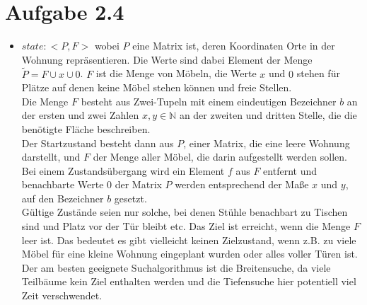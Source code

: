 \documentclass[12pt, paper=a4]{article}
\begin{document}
\section*{Aufgabe 2.4}
\begin{itemize}
\item $state: <P,F>$ wobei $P$ eine Matrix ist, deren Koordinaten Orte in der Wohnung repräsentieren.
    Die Werte sind dabei Element der Menge $\tilde{P} = F \cup x \cup 0$.
      $F$ ist die Menge von Möbeln, die Werte $x$ und $0$ stehen für Plätze auf denen keine
      Möbel stehen können und freie Stellen.\\
      Die Menge $F$ besteht aus Zwei-Tupeln mit einem eindeutigen Bezeichner $b$ an der ersten
      und zwei Zahlen $x, y \in \mathbb{N}$ an der zweiten und dritten Stelle, die die benötigte
      Fläche beschreiben.\\
      
      Der Startzustand besteht dann aus $P$, einer Matrix, die eine leere Wohnung darstellt, und
      $F$ der Menge aller Möbel, die darin aufgestellt werden sollen. Bei einem Zustandsübergang
      wird ein Element $f$ aus $F$ entfernt und benachbarte Werte $0$ der Matrix $P$ werden
      entsprechend der Maße $x$ und $y$, auf den Bezeichner $b$ gesetzt.\\
      Gültige Zustände seien nur solche, bei denen Stühle benachbart zu Tischen sind und Platz
      vor der Tür bleibt etc. Das Ziel ist erreicht, wenn die Menge $F$ leer ist. Das bedeutet es
      gibt vielleicht keinen Zielzustand, wenn z.B. zu viele Möbel für eine kleine Wohnung eingeplant
      wurden oder alles voller Türen ist.\\
      Der am besten geeignete Suchalgorithmus ist die Breitensuche, da viele Teilbäume kein Ziel
      enthalten werden und die Tiefensuche hier potentiell viel Zeit verschwendet.


\end{itemize}
\end{document}
